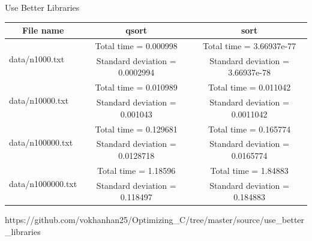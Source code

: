 \documentclass[aspectratio=169,xcolor=dvipsnames]{beamer}
\begin{document}
\begin{frame}{Use Better Libraries}
\begin{center}
        \begin{tabular}{|c|c|c|}
        \hline
            File name & qsort & sort \\    
        \hline
            \multicolumn{1}{|l|}{\multirow{2}{*}{data/n1000.txt}} & Total time = 0.000998 & Total time = 3.66937e-77\\
            \multicolumn{1}{|l|}{} & Standard deviation = 0.0002994 & Standard deviation = 3.66937e-78\\
            \hline
            \multicolumn{1}{|l|}{\multirow{2}{*}{data/n10000.txt}} & Total time = 0.010989 & Total time = 0.011042\\
            \multicolumn{1}{|l|}{} & Standard deviation = 0.001043 & Standard deviation = 0.0011042\\
            \hline
            \multicolumn{1}{|l|}{\multirow{2}{*}{data/n100000.txt}} & Total time = 0.129681 & Total time = 0.165774\\
            \multicolumn{1}{|l|}{} & Standard deviation = 0.0128718 & Standard deviation = 0.0165774\\
            \hline 
            \multicolumn{1}{|l|}{\multirow{2}{*}{data/n1000000.txt}} & Total time = 1.18596 & Total time = 1.84883\\
            \multicolumn{1}{|l|}{} & Standard deviation = 0.118497 & Standard deviation = 0.184883\\
        \hline
        \hline 
        \end{tabular}
    \end{center}
    \small \flushright
    https://github.com/vokhanhan25/Optimizing\_C/tree/master/source/use\_better\_libraries
\end{frame}

\end{document}
